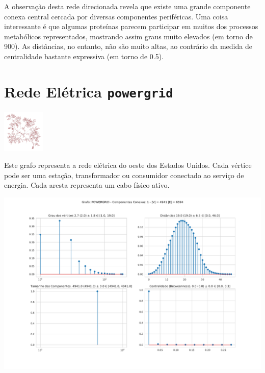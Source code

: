 \documentclass{homework}
\begin{document}
	A observação desta rede direcionada revela que existe uma grande componente conexa central cercada por diversas componentes periféricas. Uma coisa interessante é que algumas proteínas parecem participar em muitos dos processos metabólicos representados, mostrando assim graus muito elevados (em torno de 900). As distâncias, no entanto, não são muito altas, ao contrário da medida de centralidade bastante expressiva (em torno de 0.5).
	
	\section{Rede Elétrica \texttt{powergrid}}
	
	\begin{multicols}{2}
		\begin{fig}
			\includegraphics[width=0.15\textwidth]{../results/powergrid-graph.png}
		\end{fig}
		
		Este grafo representa a rede elétrica do oeste dos Estados Unidos. Cada vértice pode ser uma estação, transformador ou consumidor conectado ao serviço de energia. Cada aresta representa um cabo físico ativo.
		
	\end{multicols}
	
	\begin{fig}
		\includegraphics[width=\textwidth]{../results/powergrid-data.pdf}
	\end{fig}
	
\end{document}
